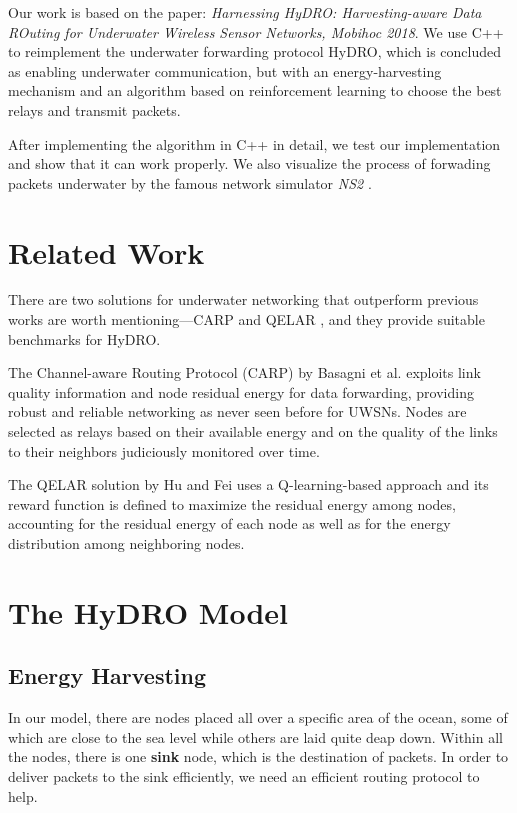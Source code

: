 \documentclass[10pt,twocolumn,letterpaper]{article}
\begin{document}
Our work is based on the paper: \textsl{Harnessing HyDRO: Harvesting-aware Data ROuting for Underwater Wireless Sensor Networks, Mobihoc 2018}. \cite{Basagni:2018:HHH:3209582.3209610} We use C++ to reimplement the underwater forwarding protocol HyDRO, which is  concluded as enabling underwater communication, but with an energy-harvesting mechanism and an algorithm based on reinforcement learning to choose the best relays and transmit packets. 


After implementing the algorithm in C++ in detail, we test our implementation and show that it can work properly. We also visualize the process of forwading packets underwater by the famous network simulator \textsl{NS2} \cite{ns2}.


\section{Related Work}

There are two solutions for underwater networking that outperform previous works are worth mentioning---CARP \cite{BASAGNI201592} and QELAR \cite{5408367}, and they provide suitable benchmarks for HyDRO.

The Channel-aware Routing Protocol (CARP) by Basagni et al. exploits link quality information and node residual energy for data forwarding, providing robust and reliable networking as never seen before for UWSNs. Nodes are selected as relays based on their available energy and on the quality of the links to their neighbors judiciously monitored over time.

The QELAR solution by Hu and Fei uses a Q-learning-based approach and its reward function is defined to maximize the residual energy among nodes, accounting for the residual energy of each node as well as for the energy distribution among neighboring nodes.

\section{The HyDRO Model}
\subsection{Energy Harvesting}
In our model, there are nodes placed all over a specific area of the ocean, some of which are close to the sea level while others are laid quite deap down. Within all the nodes, there is one \textbf{sink} node, which is the destination of packets. In order to deliver packets to the sink efficiently, we need an efficient routing protocol to help. 
\end{document}
